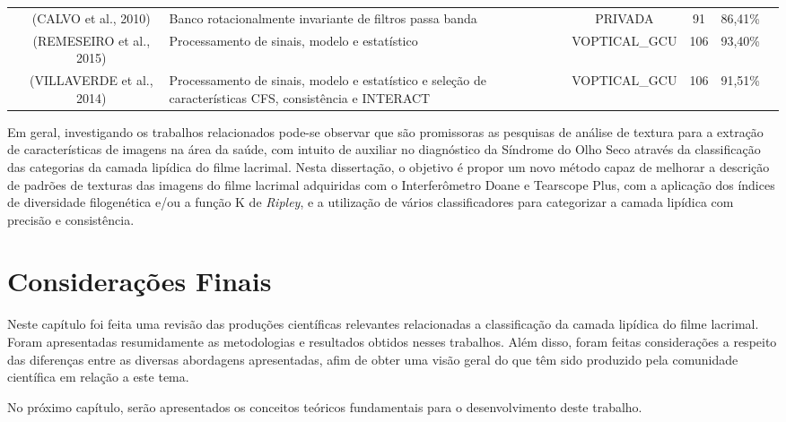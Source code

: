 \begin{table}[!ht]
{\begin{tabular}{lcp{8cm}cccc}
 & (CALVO et al., 2010) \cellcolor{lightgray} & Banco rotacionalmente invariante de filtros passa banda \cellcolor{lightgray} & PRIVADA \cellcolor{lightgray} & 91 \cellcolor{lightgray} & 86,41\% \cellcolor{lightgray}\\ \cline{2-6} \parbox[t]{5mm}{}
 & (REMESEIRO et al., 2015) & Processamento de sinais, modelo e estatístico & VOPTICAL\_GCU & 106 & 93,40\% \\
 & (VILLAVERDE et al., 2014)  & Processamento de sinais, modelo e estatístico e seleção de características CFS, consistência e INTERACT  & VOPTICAL\_GCU  & 106  & 91,51\% \\  
\end{tabular}
}
\end{table}

Em geral, investigando os trabalhos relacionados pode-se observar que são promissoras as pesquisas de análise de textura para a extração de características de imagens na área da saúde, com intuito de auxiliar no diagnóstico da Síndrome do Olho Seco através da classificação das categorias da camada lipídica do filme lacrimal. Nesta dissertação, o objetivo é propor um novo método capaz de melhorar a descrição de padrões de texturas das imagens do filme lacrimal adquiridas com o Interferômetro Doane e Tearscope Plus, com a aplicação dos índices de diversidade filogenética e/ou a função K de \textit{Ripley}, e a utilização de vários classificadores para categorizar a camada lipídica com precisão e consistência.

\section{Considerações Finais}

Neste capítulo foi feita uma revisão das produções científicas relevantes relacionadas a classificação da camada lipídica do filme lacrimal. Foram apresentadas resumidamente as metodologias e resultados obtidos nesses trabalhos. Além disso, foram feitas considerações a respeito das diferenças entre as diversas abordagens apresentadas, afim de obter uma visão geral do que têm sido produzido pela comunidade científica em relação a este tema.

No próximo capítulo, serão apresentados os conceitos teóricos fundamentais para o desenvolvimento deste trabalho.